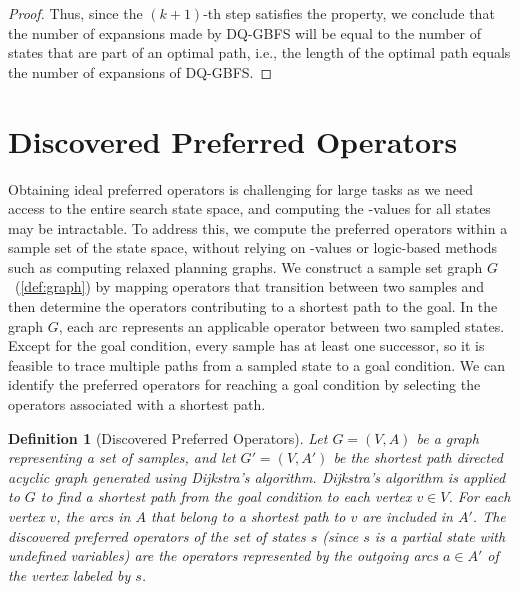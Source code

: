 \documentclass[ppgc,diss,english]{iiufrgs}
\newtheorem{definition}{Definition}
\begin{document}
\begin{proof}
Thus, since the $(k+1)$-th step satisfies the property, we conclude that the number of expansions made by DQ-GBFS will be equal to the number of states that are part of an optimal path, i.e., the length of the optimal path equals the number of expansions of DQ-GBFS.
\end{proof}


\section{Discovered Preferred Operators}
\label{sec:sample-discovered-po}
Obtaining ideal preferred operators is challenging for large tasks as we need access to the entire search state space, and computing the \hstar-values for all states may be intractable. To address this, we compute the preferred operators within a sample set of the state space, without relying on \hstar-values or logic-based methods such as computing relaxed planning graphs. We construct a sample set graph $G$~(\vref{def:graph}) by mapping operators that transition between two samples and then determine the operators contributing to a shortest path to the goal.
In the graph $G$, each arc represents an applicable operator between two sampled states. Except for the goal condition, every sample has at least one successor, so it is feasible to trace multiple paths from a sampled state to a goal condition. We can identify the preferred operators for reaching a goal condition by selecting the operators associated with a shortest path.

\begin{definition}[Discovered Preferred Operators]\label{def:discovered_preferred_operators}
Let $G = (V, A)$ be a graph representing a set of samples, and let $G' = (V, A')$ be the shortest path directed acyclic graph generated using Dijkstra's algorithm. Dijkstra's algorithm is applied to $G$ to find a shortest path from the goal condition to each vertex $v \in V$. For each vertex $v$, the arcs in $A$ that belong to a shortest path to $v$ are included in $A'$. The discovered preferred operators of the set of states $s$ (since $s$ is a partial state with undefined variables) are the operators represented by the outgoing arcs $a \in A'$ of the vertex labeled by $s$.
\end{definition}
\end{document}

